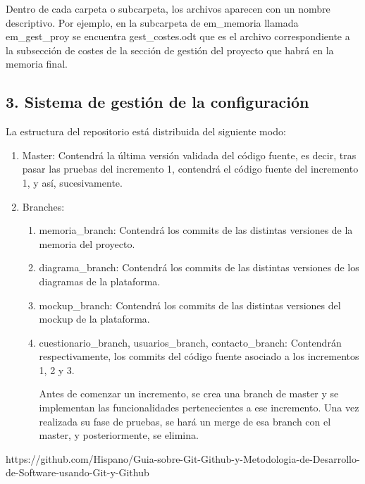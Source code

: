 \documentclass{article}
\begin{document}
\bigskip

Dentro de cada carpeta o subcarpeta, los archivos aparecen con un nombre descriptivo. Por ejemplo, en la subcarpeta de em\_memoria llamada em\_gest\_proy se encuentra gest\_costes.odt que es el archivo correspondiente a la subsecci\'on de costes de la secci\'on de gesti\'on del proyecto que habr\'a en la memoria final.


\bigskip

\subsection[3. Sistema de gesti\'on de la configuraci\'on]{3. Sistema de gesti\'on de la configuraci\'on}
La estructura del repositorio est\'a distribuida del siguiente modo:

\begin{enumerate}
\item Master: Contendr\'a la \'ultima versi\'on validada del c\'odigo fuente, es decir, tras pasar las pruebas del incremento 1, contendr\'a el c\'odigo fuente del incremento 1, y as\'i, sucesivamente.
\item Branches:

\begin{enumerate}
\item memoria\_branch: Contendr\'a los commits de las distintas versiones de la memoria del proyecto.
\item diagrama\_branch: Contendr\'a los commits de las distintas versiones de los diagramas de la plataforma.
\item mockup\_branch: Contendr\'a los commits de las distintas versiones del mockup de la plataforma.
\item cuestionario\_branch, usuarios\_branch, contacto\_branch: Contendr\'an respectivamente, los commits del c\'odigo fuente asociado a los incrementos 1, 2 y 3.

Antes de comenzar un incremento, se crea una branch de master y se implementan las funcionalidades pertenecientes a ese incremento. Una vez realizada su fase de pruebas, se har\'a un merge de esa branch con el master, y posteriormente, se elimina.
\end{enumerate}
\end{enumerate}

\bigskip

https://github.com/Hispano/Guia-sobre-Git-Github-y-Metodologia-de-Desarrollo-de-Software-usando-Git-y-Github
\end{document}
